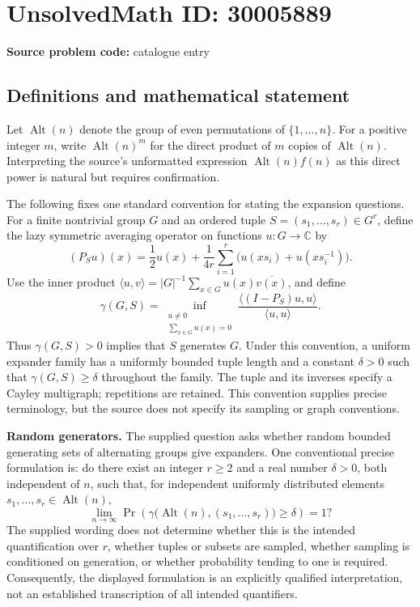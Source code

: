 \documentclass[11pt]{article}
\newcommand{\C}{\mathbb{C}}
\begin{document}
\section*{UnsolvedMath ID: 30005889}
\textbf{Source problem code:} catalogue entry
\subsection{Definitions and mathematical statement}
Let \(\operatorname{Alt}(n)\) denote the group of even permutations of \(\{1,\ldots,n\}\). For a positive integer \(m\), write \(\operatorname{Alt}(n)^m\) for the direct product of \(m\) copies of \(\operatorname{Alt}(n)\). Interpreting the source's unformatted expression \(\operatorname{Alt}(n)f(n)\) as this direct power is natural but requires confirmation.

The following fixes one standard convention for stating the expansion questions. For a finite nontrivial group \(G\) and an ordered tuple \(S=(s_1,\ldots,s_r)\in G^r\), define the lazy symmetric averaging operator on functions \(u:G\to\C\) by
\[
 (P_Su)(x)=\frac12u(x)+\frac{1}{4r}\sum_{i=1}^r\bigl(u(xs_i)+u(xs_i^{-1})\bigr).
\]
Use the inner product \(\langle u,v\rangle=|G|^{-1}\sum_{x\in G}u(x)\overline{v(x)}\), and define
\[
 \gamma(G,S)=\inf_{\substack{u\ne0\\\sum_{x\in G}u(x)=0}}
 \frac{\langle (I-P_S)u,u\rangle}{\langle u,u\rangle}.
\]
Thus \(\gamma(G,S)>0\) implies that \(S\) generates \(G\). Under this convention, a uniform expander family has a uniformly bounded tuple length and a constant \(\delta>0\) such that \(\gamma(G,S)\ge\delta\) throughout the family. The tuple and its inverses specify a Cayley multigraph; repetitions are retained. This convention supplies precise terminology, but the source does not specify its sampling or graph conventions.

\textbf{Random generators.} The supplied question asks whether random bounded generating sets of alternating groups give expanders. One conventional precise formulation is: do there exist an integer \(r\ge2\) and a real number \(\delta>0\), both independent of \(n\), such that, for independent uniformly distributed elements \(s_1,\ldots,s_r\in\operatorname{Alt}(n)\),
\[
 \lim_{n\to\infty}\Pr\!\left(\gamma\bigl(\operatorname{Alt}(n),(s_1,\ldots,s_r)\bigr)\ge\delta\right)=1?
\]
The supplied wording does not determine whether this is the intended quantification over \(r\), whether tuples or subsets are sampled, whether sampling is conditioned on generation, or whether probability tending to one is required. Consequently, the displayed formulation is an explicitly qualified interpretation, not an established transcription of all intended quantifiers.
\end{document}
